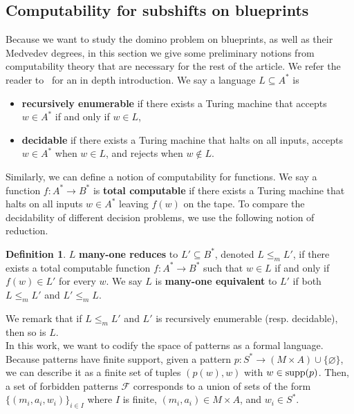 \documentclass{article}
\theoremstyle{definition}
\newtheorem{defn}[theorem]{Definition} %
\theoremstyle{definition}
\newcommand{\Fo}{\mathcal{F}}
\newcommand{\supp}{\textnormal{supp}}
\newcommand{\define}[1]{\textbf{#1}}
\begin{document}
\subsection{Computability for subshifts on blueprints}

Because we want to study the domino problem on blueprints, as well as their Medvedev degrees, in this section we give some preliminary notions from computability theory that are necessary for the rest of the article. We refer the reader to~\cite{sipser1996introduction,soare2016turing} for an in depth introduction. We say a language $L\subseteq A^*$ is
    \begin{itemize}
        \item \define{recursively enumerable} if there exists a Turing machine that accepts $w\in A^*$ if and only if $w\in L$,
        \item  \define{decidable} if there exists a Turing machine that halts on all inputs, accepts $w\in A^*$ when $w\in L$, and rejects when $w\notin L$.
    \end{itemize}
Similarly, we can define a notion of computability for functions. We say a function $f\colon A^*\to B^*$ is \define{total computable} if there exists a Turing machine that halts on all inputs $w\in A^*$ leaving $f(w)$ on the tape. To compare the decidability of different decision problems, we use the following notion of reduction.
\begin{defn}
$L$ \define{many-one reduces} to $L'\subseteq B^*$, denoted $L\leq_m L'$, if there exists a total computable function $f\colon A^*\to B^*$ such that $w\in L$ if and only if $f(w)\in L'$ for every $w$. We say $L$ is \define{many-one equivalent} to $L'$ if both $L\leq_m L'$ and $L'\leq_m L$.
\end{defn}

We remark that if $L \leq_m L'$ and $L'$ is recursively enumerable (resp. decidable), then so is $L$.\\

In this work, we want to codify the space of patterns as a formal language. Because patterns have finite support, given a pattern $p\colon S^*\to (M\times A)\cup\{\varnothing\}$, we can describe it as a finite set of tuples $(p(w), w)$ with $w\in\supp(p)$. Then, a set of forbidden patterns $\Fo$ corresponds to a union of sets of the form $\{(m_i,a_i,w_i)\}_{i\in I}$ where $I$ is finite, $(m_i,a_i) \in M \times A$, and $w_i\in S^*$.
\end{document}
